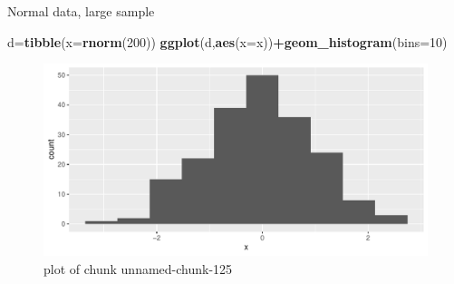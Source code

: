 \documentclass[ignorenonframetext,]{beamer}
\newenvironment{Shaded}{\begin{snugshade}}{\end{snugshade}}
\newcommand{\DataTypeTok}[1]{\textcolor[rgb]{0.13,0.29,0.53}{#1}}
\newcommand{\DecValTok}[1]{\textcolor[rgb]{0.00,0.00,0.81}{#1}}
\newcommand{\KeywordTok}[1]{\textcolor[rgb]{0.13,0.29,0.53}{\textbf{#1}}}
\newcommand{\NormalTok}[1]{#1}
\newcommand{\OperatorTok}[1]{\textcolor[rgb]{0.81,0.36,0.00}{\textbf{#1}}}
\begin{document}
\begin{frame}[fragile]{Normal data, large sample}
\protect\hypertarget{normal-data-large-sample}{}

\begin{Shaded}
\begin{Highlighting}[]
\NormalTok{d=}\KeywordTok{tibble}\NormalTok{(}\DataTypeTok{x=}\KeywordTok{rnorm}\NormalTok{(}\DecValTok{200}\NormalTok{))}
\KeywordTok{ggplot}\NormalTok{(d,}\KeywordTok{aes}\NormalTok{(}\DataTypeTok{x=}\NormalTok{x))}\OperatorTok{+}\KeywordTok{geom_histogram}\NormalTok{(}\DataTypeTok{bins=}\DecValTok{10}\NormalTok{)}
\end{Highlighting}
\end{Shaded}

\begin{figure}
\centering
\includegraphics{figure/unnamed-chunk-125-1.pdf}
\caption{plot of chunk unnamed-chunk-125}
\end{figure}

\end{frame}
\end{document}
